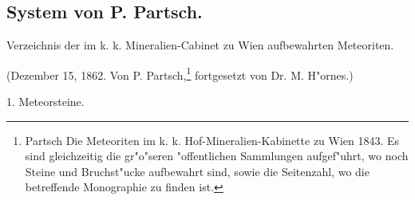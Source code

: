 \documentclass[a4paper, 11pt, oneside]{article}
\begin{document}
\subsection*{System von P. Partsch.}
\begin{center}
Verzeichnis der im k. k. Mineralien-Cabinet zu Wien aufbewahrten Meteoriten.

(Dezember 15, 1862. Von P. Partsch,\footnote{Partsch Die Meteoriten im k. k. Hof-Mineralien-Kabinette zu Wien 1843. Es sind gleichzeitig die gr"o"seren "offentlichen Sammlungen aufgef"uhrt, wo noch Steine und Bruchst"ucke aufbewahrt sind, sowie die Seitenzahl, wo die betreffende Monographie zu finden ist.} fortgesetzt von Dr. M. H"ornes.)
\end{center}
\begin{center}
1. Meteorsteine.
\end{center}
\end{document}

